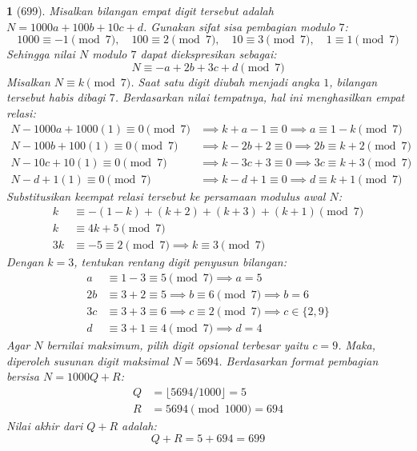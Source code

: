 \documentclass[11pt,a4paper,DIV=12]{scrartcl}
\theoremstyle{problemstyle}
\theoremstyle{answerstyle}
\newtheorem{answer}{}
\begin{document}
\begin{answer}[699]
  Misalkan bilangan empat digit tersebut adalah $N = 1000a + 100b + 10c + d$. Gunakan sifat sisa pembagian modulo $7$:
  $$ 1000 \equiv -1 \pmod 7, \quad 100 \equiv 2 \pmod 7, \quad 10 \equiv 3 \pmod 7, \quad 1 \equiv 1 \pmod 7 $$
  Sehingga nilai $N$ modulo $7$ dapat diekspresikan sebagai:
  $$ N \equiv -a + 2b + 3c + d \pmod 7 $$
  Misalkan $N \equiv k \pmod 7$. Saat satu digit diubah menjadi angka $1$, bilangan tersebut habis dibagi $7$. Berdasarkan nilai tempatnya, hal ini menghasilkan empat relasi:
  \begin{align*}
    N - 1000a + 1000(1) \equiv 0 \pmod 7 & \implies k + a - 1 \equiv 0 \implies a \equiv 1-k \pmod 7   \\
    N - 100b + 100(1) \equiv 0 \pmod 7   & \implies k - 2b + 2 \equiv 0 \implies 2b \equiv k+2 \pmod 7 \\
    N - 10c + 10(1) \equiv 0 \pmod 7     & \implies k - 3c + 3 \equiv 0 \implies 3c \equiv k+3 \pmod 7 \\
    N - d + 1(1) \equiv 0 \pmod 7        & \implies k - d + 1 \equiv 0 \implies d \equiv k+1 \pmod 7
  \end{align*}
  Substitusikan keempat relasi tersebut ke persamaan modulus awal $N$:
  \begin{align*}
    k  & \equiv -(1-k) + (k+2) + (k+3) + (k+1) \pmod 7          \\
    k  & \equiv 4k + 5 \pmod 7                                  \\
    3k & \equiv -5 \equiv 2 \pmod 7 \implies k \equiv 3 \pmod 7
  \end{align*}
  Dengan $k=3$, tentukan rentang digit penyusun bilangan:
  \begin{align*}
    a  & \equiv 1-3 \equiv 5 \pmod 7 \implies a = 5                              \\
    2b & \equiv 3+2 \equiv 5 \implies b \equiv 6 \pmod 7 \implies b = 6          \\
    3c & \equiv 3+3 \equiv 6 \implies c \equiv 2 \pmod 7 \implies c \in \{2, 9\} \\
    d  & \equiv 3+1 \equiv 4 \pmod 7 \implies d = 4
  \end{align*}
  Agar $N$ bernilai maksimum, pilih digit opsional terbesar yaitu $c = 9$. Maka, diperoleh susunan digit maksimal $N = 5694$.
  Berdasarkan format pembagian bersisa $N = 1000Q + R$:
  \begin{align*}
    Q & = \lfloor 5694 / 1000 \rfloor = 5 \\
    R & = 5694 \pmod{1000} = 694
  \end{align*}
  Nilai akhir dari $Q+R$ adalah:
  $$ Q+R = 5 + 694 = \boxed{699} $$
\end{answer}
\end{document}
